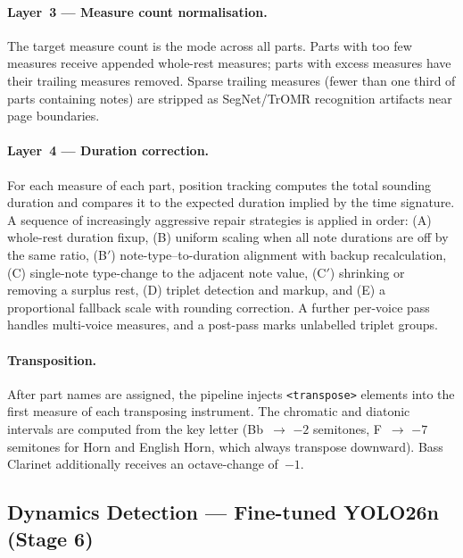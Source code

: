 \documentclass[11pt,a4paper]{article}
\begin{document}
\paragraph{Layer~3 --- Measure count normalisation.}
The target measure count is the mode across all parts.
Parts with too few measures receive appended whole-rest measures; parts with excess measures have their trailing measures removed.
Sparse trailing measures (fewer than one third of parts containing notes) are stripped as SegNet/TrOMR recognition artifacts near page boundaries.

\paragraph{Layer~4 --- Duration correction.}
For each measure of each part, position tracking computes the total sounding duration and compares it to the expected duration implied by the time signature.
A sequence of increasingly aggressive repair strategies is applied in order: (A) whole-rest duration fixup, (B) uniform scaling when all note durations are off by the same ratio, (B$'$) note-type--to-duration alignment with backup recalculation, (C) single-note type-change to the adjacent note value, (C$'$) shrinking or removing a surplus rest, (D) triplet detection and markup, and (E) a proportional fallback scale with rounding correction.
A further per-voice pass handles multi-voice measures, and a post-pass marks unlabelled triplet groups.

\paragraph{Transposition.}
After part names are assigned, the pipeline injects \texttt{<transpose>} elements into the first measure of each transposing instrument.
The chromatic and diatonic intervals are computed from the key letter (Bb~$\to$ $-2$ semitones, F~$\to$ $-7$ semitones for Horn and English Horn, which always transpose downward).
Bass Clarinet additionally receives an octave-change of~$-1$.

\subsection{Dynamics Detection --- Fine-tuned YOLO26n (Stage 6)}
\end{document}
